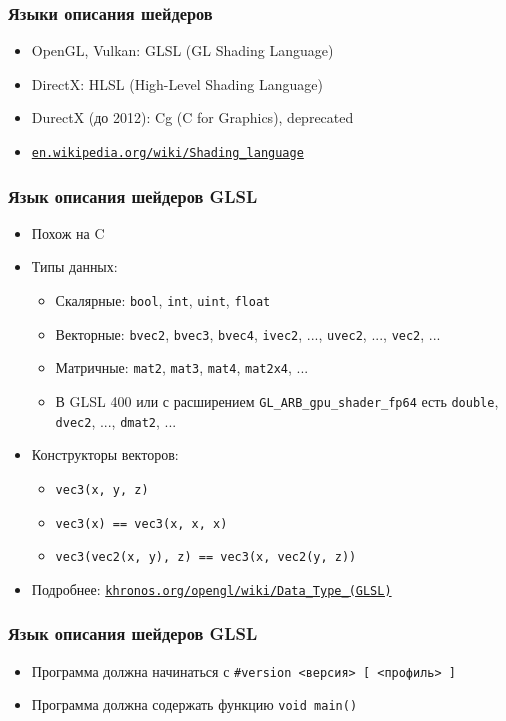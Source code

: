 \documentclass{beamer}
\begin{document}
\begin{frame}[fragile]
\frametitle{Языки описания шейдеров}
\begin{itemize}
\item OpenGL, Vulkan: GLSL (GL Shading Language)
\pause
\item DirectX: HLSL (High-Level Shading Language)
\pause
\item DurectX (до 2012): Cg (C for Graphics), deprecated
\pause
\item \href{https://en.wikipedia.org/wiki/Shading_language}{\nolinkurl{en.wikipedia.org/wiki/Shading\_language}}
\end{itemize}
\end{frame}

\begin{frame}[fragile]
\frametitle{Язык описания шейдеров GLSL}
\begin{itemize}
\item Похож на C
\pause
\item Типы данных:
\pause
\begin{itemize}
\item Скалярные: \verb|bool|, \verb|int|, \verb|uint|, \verb|float|
\pause
\item Векторные: \verb|bvec2|, \verb|bvec3|, \verb|bvec4|, \verb|ivec2|, ..., \verb|uvec2|, ..., \verb|vec2|, ...
\pause
\item Матричные: \verb|mat2|, \verb|mat3|, \verb|mat4|, \verb|mat2x4|, ...
\pause
\item В GLSL 400 или с расширением \verb|GL_ARB_gpu_shader_fp64| есть \verb|double|, \verb|dvec2|, ..., \verb|dmat2|, ...
\end{itemize}
\pause
\item Конструкторы векторов:
\pause
\begin{itemize}
\item \verb|vec3(x, y, z)|
\pause
\item \verb|vec3(x) == vec3(x, x, x)|
\pause
\item \verb|vec3(vec2(x, y), z) == vec3(x, vec2(y, z))|
\end{itemize}
\pause
\item Подробнее: \href{https://www.khronos.org/opengl/wiki/Data_Type_(GLSL)}{\nolinkurl{khronos.org/opengl/wiki/Data\_Type\_(GLSL)}}
\end{itemize}
\end{frame}

\begin{frame}[fragile]
\frametitle{Язык описания шейдеров GLSL}
\begin{itemize}
\item Программа должна начинаться с \verb|#version <версия> [ <профиль> ]|
\pause
\item Программа должна содержать функцию \verb|void main()|
\end{itemize}
\end{frame}
\end{document}
